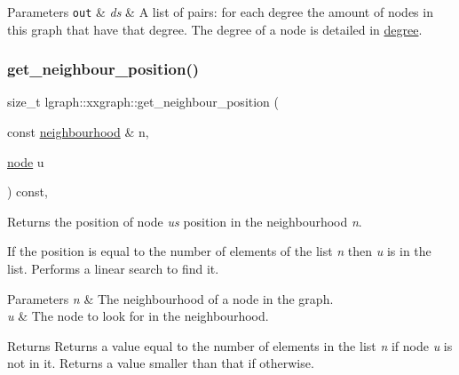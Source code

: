 \begin{DoxyParams}[1]{Parameters}
\mbox{\tt out}  & {\em ds} & A list of pairs\+: for each degree the amount of nodes in this graph that have that degree. The degree of a node is detailed in \hyperlink{classlgraph_1_1xxgraph_a20ebc2927ee8fb8bb0a2c3b448d9ed78}{degree}. \\
\hline
\end{DoxyParams}
\mbox{\label{classlgraph_1_1xxgraph_abb0c474cb162940aba3439124c1202d7}} 
\subsubsection{\texorpdfstring{get\+\_\+neighbour\+\_\+position()}{get\_neighbour\_position()}}
{\footnotesize\ttfamily size\+\_\+t lgraph\+::xxgraph\+::get\+\_\+neighbour\+\_\+position (\begin{DoxyParamCaption}\item[{const \hyperlink{namespacelgraph_a052e7766c13f3a43cec0aec8173fdede}{neighbourhood} \&}]{n,  }\item[{\hyperlink{namespacelgraph_a397169dd66adf725210a30fb7251773e}{node}}]{u }\end{DoxyParamCaption}) const\hspace{0.3cm}{\ttfamily [protected]}, {\ttfamily [inherited]}}



Returns the position of node {\itshape u\textquotesingle{}s} position in the neighbourhood {\itshape n}. 

If the position is equal to the number of elements of the list {\itshape n} then {\itshape u} is in the list. Performs a linear search to find it.


\begin{DoxyParams}{Parameters}
{\em n} & The neighbourhood of a node in the graph. \\
\hline
{\em u} & The node to look for in the neighbourhood. \\
\hline
\end{DoxyParams}
\begin{DoxyReturn}{Returns}
Returns a value equal to the number of elements in the list {\itshape n} if node {\itshape u} is not in it. Returns a value smaller than that if otherwise. 
\end{DoxyReturn}
\mbox{\label{classlgraph_1_1xxgraph_a745a535506115c66ce0993ef7e7759ba}} 
